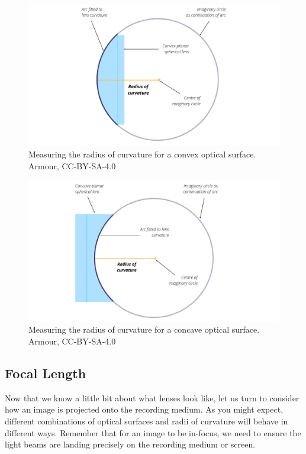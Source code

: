 \documentclass[
]{book}
\begin{document}
\begin{figure}
\includegraphics[width=0.9\linewidth]{images/12-ROC_convex} \caption{Measuring the radius of curvature for a convex optical surface. Armour, CC-BY-SA-4.0}\label{fig:12-RoC-convex}
\end{figure}

\begin{figure}
\includegraphics[width=0.9\linewidth]{images/12-ROC_concave} \caption{Measuring the radius of curvature for a concave optical surface. Armour, CC-BY-SA-4.0}\label{fig:12-RoC-concave}
\end{figure}

\subsection{Focal Length}\label{focal-length}

Now that we know a little bit about what lenses look like, let us turn to consider how an image is projected onto the recording medium. As you might expect, different combinations of optical surfaces and radii of curvature will behave in different ways. Remember that for an image to be in-focus, we need to ensure the light beams are landing precisely on the recording medium or screen.
\end{document}
